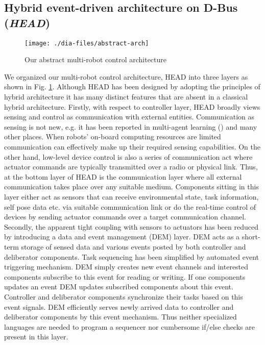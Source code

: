 \subsection{Hybrid event-driven architecture on D-Bus ({\em HEAD})}
\begin{figure}
\begin{center}
\texttt{[image: ./dia-files/abstract-arch]} %
\caption{Our abstract multi-robot control architecture} 
\label{fig:abstract-arch}
\end{center}
\end{figure}
We organized our  multi-robot control architecture, HEAD into three layers as shown in Fig. \ref{fig:abstract-arch}. Although HEAD has been designed by adopting the principles of hybrid architecture it has many distinct features that are absent in a classical hybrid architecture. Firstly, with respect to controller layer, HEAD broadly views sensing and control as communication with external entities. Communication as sensing is not new, e.g. it has been reported in multi-agent learning (\cite{Mataric1998}) and many other places. When robots' on-board computing resources are limited communication can effectively make up their required sensing capabilities. On the other hand, low-level device control is also a series of communication act where actuator commands are typically transmitted over a radio or physical link. Thus, at the bottom layer of HEAD is the communication layer where all external communication takes place over any suitable medium. Components sitting in this layer either act as sensors that can receive environmental state, task information, self pose data etc. via suitable communication link or do the real-time control of devices by sending actuator commands over a target communication channel. \\
Secondly, the apparent tight coupling with sensors to actuators has been reduced by introducing a data and event management (DEM) layer. DEM acts as a short-term storage of sensed data and various events posted by both controller and deliberator components. Task sequencing has been simplified by automated event triggering mechanism. DEM simply creates new event channels and interested components subscribe to this event for reading or writing. If one components updates an event DEM updates subscribed components about this event. Controller and deliberator components synchronize their tasks based on this event signals. DEM efficiently serves newly arrived data to controller and deliberator components by this event mechanism. Thus neither specialized languages are needed to program a sequencer nor cumbersome if/else checks are present in this layer.\\
